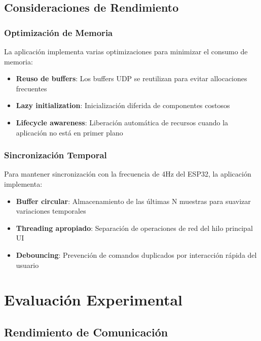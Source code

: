 \documentclass[conference,a4paper]{IEEEtran}
\begin{document}
\subsection{Consideraciones de Rendimiento}

\subsubsection{Optimizaci\'on de Memoria}

La aplicaci\'on implementa varias optimizaciones para minimizar el consumo de memoria:

\begin{itemize}
    \item \textbf{Reuso de buffers}: Los buffers UDP se reutilizan para evitar allocaciones frecuentes
    \item \textbf{Lazy initialization}: Inicializaci\'on diferida de componentes costosos
    \item \textbf{Lifecycle awareness}: Liberaci\'on autom\'atica de recursos cuando la aplicaci\'on no est\'a en primer plano
\end{itemize}

\subsubsection{Sincronizaci\'on Temporal}

Para mantener sincronizaci\'on con la frecuencia de 4Hz del ESP32, la aplicaci\'on implementa:

\begin{itemize}
    \item \textbf{Buffer circular}: Almacenamiento de las \'ultimas N muestras para suavizar variaciones temporales
    \item \textbf{Threading apropiado}: Separaci\'on de operaciones de red del hilo principal UI
    \item \textbf{Debouncing}: Prevenci\'on de comandos duplicados por interacci\'on r\'apida del usuario
\end{itemize}

\section{Evaluaci\'on Experimental}

\subsection{Rendimiento de Comunicaci\'on}
\end{document}
